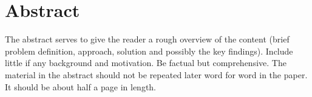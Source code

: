 \section*{Abstract} %

The abstract serves to give the reader a rough overview of the content (brief problem definition, approach,
solution and possibly the key findings). Include little if any background and motivation. Be factual but
comprehensive. The material in the abstract should not be repeated later word for word in the paper. It
should be about half a page in length. 
